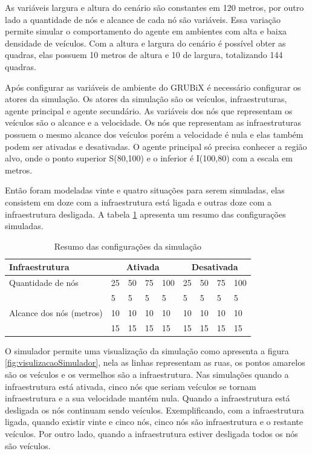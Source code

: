 As variáveis largura e altura do cenário são constantes em 120 metros, por outro lado a quantidade de nós e alcance de cada nó são variáveis. Essa variação permite simular o comportamento do agente em ambientes com alta e baixa densidade de veículos. Com a altura e largura do cenário é possível obter as quadras, elas possuem 10 metros de altura e 10 de largura, totalizando 144 quadras.

Após configurar as variáveis de ambiente do GRUBiX é necessário configurar os atores da simulação. Os atores da simulação são os veículos, infraestruturas, agente principal e agente secundário. As variáveis dos nós que representam os veículos são o alcance e a velocidade. Os nós que representam as infraestruturas possuem o mesmo alcance dos veículos porém a velocidade é nula e elas também podem ser ativadas e desativadas. O agente principal só precisa conhecer a região alvo, onde o ponto superior S(80,100) e o inferior é I(100,80) com a escala em metros.

Então foram modeladas vinte e quatro situações para serem simuladas, elas consistem em doze com a infraestrutura está ligada e outras doze com a infraestrutura desligada. A tabela \ref{tab:resumoConfiguracaoSimulacao} apresenta um resumo das configurações simuladas. 

\begin{table}[ht]
	\centering
	\begin{tabular}{| l | l | l | l | l | l | l | l | l |}
		\hline
		Infraestrutura & \multicolumn{4}{|c|}{Ativada} & \multicolumn{4}{|c|}{Desativada} \\ \hline
		Quantidade de nós & 25 & 50 & 75 & 100 & 25 & 50 & 75 & 100 \\ \hline
		\multirow{3}{*}{Alcance dos nós (metros)} & 5 & 5 & 5 & 5 & 5 & 5 & 5 & 5 \\
		& 10 & 10 & 10 & 10 & 10 & 10 & 10 & 10 \\
		& 15 & 15 & 15 & 15 & 15 & 15 & 15 & 15 \\
		\hline 
	\end{tabular}
	\caption{Resumo das configurações da simulação}
	\label{tab:resumoConfiguracaoSimulacao}
\end{table}

O simulador permite uma visualização da simulação como apresenta a figura \ref{fig:visulizacaoSimulador}, nela as linhas representam as ruas, os pontos amarelos são os veículos e os vermelhos são a infraestrutura. Nas simulações quando a infraestrutura está ativada, cinco nós que seriam veículos se tornam infraestrutura e a sua velocidade mantém nula. Quando a infraestrutura está desligada os nós continuam sendo veículos. Exemplificando, com a infraestrutura ligada, quando existir vinte e cinco nós, cinco nós são infraestrutura e o restante veículos. Por outro lado, quando a infraestrutura estiver desligada todos os nós são veículos.

